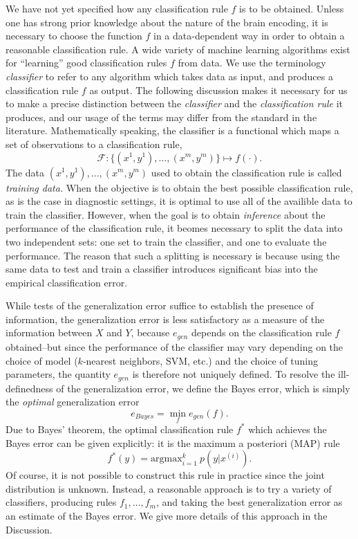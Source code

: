\documentclass{article}
\newcommand{\argmax}{\text{argmax}}
\begin{document}
We have not yet specified how any classification rule $f$ is to be
obtained.  Unless one has strong prior knowledge about the nature of
the brain encoding, it is necessary to choose the function $f$ in a
data-dependent way in order to obtain a reasonable classification
rule.  A wide variety of machine learning algorithms exist for
``learning'' good classification rules $f$ from data.  We use the
terminology \emph{classifier} to refer to any algorithm which takes
data as input, and produces a classification rule $f$ as output.  The
following discussion makes it necessary for us to make a precise
distinction between the \emph{classifier} and the \emph{classification
rule} it produces, and our usage of the terms may differ from the
standard in the literature.  Mathematically speaking, the classifier
is a functional which maps a set of observations to a classification
rule,
\[
\mathcal{F}: \{(x^{1},y^{1}),\hdots, (x^{m}, y^{m})\} \mapsto f(\cdot).
\]
The data $(x^1,y^1),\hdots, (x^m, y^m)$ used to obtain the
classification rule is called \emph{training data.}  When the
objective is to obtain the best possible classification rule, as is
the case in diagnostic settings, it is optimal to use all of the
availible data to train the classifier.  However, when the goal is to
obtain \emph{inference} about the performance of the classification
rule, it beomes necessary to split the data into two independent sets:
one set to train the classifier, and one to evaluate the performance.
The reason that such a splitting is necessary is because using the
same data to test and train a classifier introduces significant bias
into the empirical classification error.

While tests of the generalization error suffice to establish the
presence of information, the generalization error is less satisfactory
as a measure of the information between $X$ and $Y$, because
$e_{gen}$ depends on the classification rule $f$ obtained--but since the performance of the classifier
may vary depending on the choice of model ($k$-nearest neighbors, SVM, etc.) and the choice of tuning parameters,
the quantity $e_{gen}$ is therefore not uniquely defined.
To resolve the ill-definedness of the generalization error, we define
the Bayes error, which is simply the \emph{optimal}
generalization error
\[
e_{Bayes} = \min_f e_{gen}(f).
\]
Due to Bayes' theorem, the optimal classification rule $f^*$ which
achieves the Bayes error can be given explicitly: it is the maximum a
posteriori (MAP) rule
\[
f^*(y) = \argmax_{i=1}^k\ p(y|x^{(i)}).
\]
Of course, it is not possible to construct this rule in practice since
the joint distribution is unknown.  Instead, a reasonable approach is
to try a variety of classifiers, producing rules $f_1,\hdots, f_m$,
and taking the best generalization error as an estimate of the Bayes
error.  We give more details of this approach in the Discussion.
\end{document}
